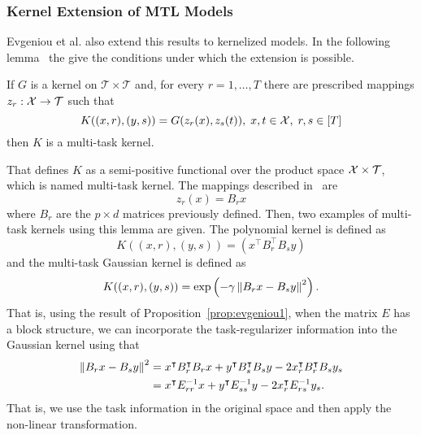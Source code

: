 \subsubsection*{Kernel Extension of MTL Models}
Evgeniou et al. also extend this results to kernelized models. In the following lemma~\cite[Lemma 2]{EvgeniouMP05} the give the conditions under which the extension is possible.

\begin{lemma}
    If $G$ is a kernel on $\mathcal{T} \times \mathcal{T}$ and, for every $r=1, \ldots, T$ there are prescribed mappings
    $z_r: \mathcal{X} \to \mathcal{T}$
    such that
    \begin{equation}
        \label{eq:evgeniou_lemma2}
        K((x, r), (y, s)) = G(z_r(x), z_s(t)),\; x, t \in \Xspace,\; r,s \in [T]
    \end{equation}
    then $K$ is a multi-task kernel.
\end{lemma}
That defines $K$ as a semi-positive functional over the product space $\mathcal{X} \times \mathcal{T}$, which is named multi-task kernel.
The mappings described in~\cite{EvgeniouMP05} are
$$ z_r(x) = B_r x$$
where $B_r$ are the $p \times d$ matrices previously defined.
Then, two examples of multi-task kernels using this lemma are given. The polynomial kernel is defined as
$$ K((x, r), (y, s)) = \left( x^\intercal B_r^\intercal B_s y\right) $$
and the multi-task Gaussian kernel is defined as
$$ K((x, r), (y, s)) = \exp\left(-\gamma \left\lVert B_r x - B_s y\right\rVert^2 \right) .$$
That is, using the result of Proposition~\ref{prop:evgeniou1}, when the matrix $E$ has a block structure, we can incorporate the task-regularizer information into the Gaussian kernel using that
\begin{align*}
    \left\lVert B_r x - B_s y\right\rVert^2 
    &= x^\intercal B_r^\intercal B_r x + y^\intercal B_s^\intercal B_s y - 2 x_r^\intercal B_r^\intercal B_s y_s \\
    &= x^\intercal E_{rr}^{-1} x + y^\intercal E_{ss}^{-1} y - 2 x_r^\intercal E_{rs}^{-1} y_s .
\end{align*}
That is, we use the task information in the original space and then apply the non-linear transformation.
%

